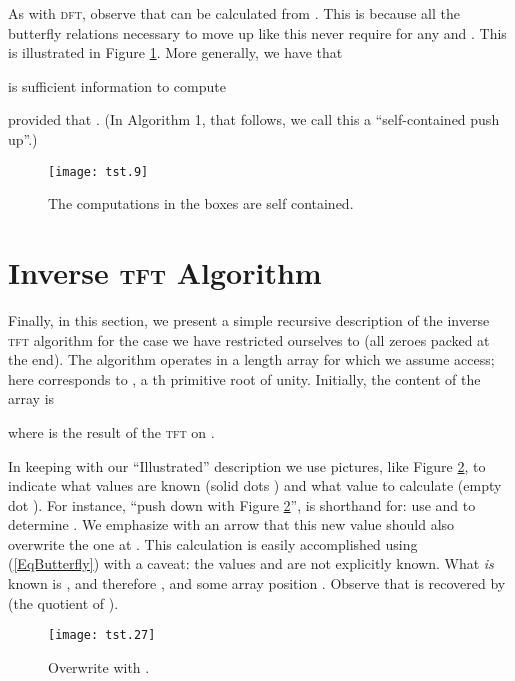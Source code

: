\documentclass[12pt]{article}
\theoremstyle{definition}
\newcommand{\0}{\mathbf{0}}
\theoremstyle{theorem}
\theoremstyle{definition}
\begin{document}
As with \textsc{dft}, observe that  can be calculated from . This is because all the butterfly relations necessary to move up like this never require  for any  and . This is illustrated in Figure \ref{boxes}. More generally, we have that

is sufficient information to compute
 
provided that . (In Algorithm 1, that follows, we call this a ``self-contained push up''.)\\

\begin{figure}[h]
\begin{center}
\texttt{[image: tst.9]}
\caption{The computations in the boxes are self contained.}
\label{boxes}
\end{center}
\end{figure}

\section{Inverse \textsc{tft} Algorithm}\label{Section::AlgTFT}

Finally, in this section, we present a simple recursive description of the inverse \textsc{tft} algorithm for the case we have restricted ourselves to (all zeroes packed at the end). The algorithm operates in a length  array  for which we assume access; here  corresponds to , a th primitive root of unity. Initially, the content of the array is

where  is the result of the \textsc{tft} on .

In keeping with our ``Illustrated'' description we use pictures, like Figure \ref{PicPic},
to indicate what values are known (solid dots ) and what value to calculate (empty dot ). For instance, ``push down  with Figure \ref{PicPic}'', is shorthand for: use  and  to determine . We emphasize with an arrow that this new value should also overwrite the one at . This calculation is easily accomplished using (\ref{EqButterfly}) with a caveat: the values  and  are not explicitly known. What \emph{is} known is , and therefore , and some array position . Observe that  is recovered by  (the quotient of ).
\begin{figure}[htp]
  \begin{center}
    \texttt{[image: tst.27]}
  \end{center}
  \caption{Overwrite  with .}
\label{PicPic}
\end{figure}
\end{document}
